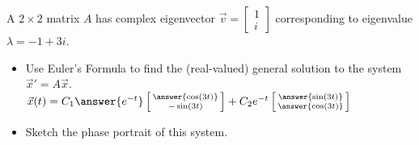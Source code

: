 \documentclass{ximera}
\begin{document}
\begin{exercise}
    A $2\times 2$ matrix $A$ has complex eigenvector $\displaystyle \vec{v}=\begin{bmatrix} 1\\ i \end{bmatrix}$ corresponding to eigenvalue $\lambda=-1+3i$. %
    \begin{itemize}
        \item Use Euler's Formula to find the (real-valued) general solution to the system $\vec{x}'=A\vec{x}$.\\
            $\vec{x}(t) = C_1\answer{e^{-t}}\left[\begin{smallmatrix} \answer{\cos(3t)} \\ -\sin(3t) \end{smallmatrix}\right] + C_2e^{-t}\left[\begin{smallmatrix} \answer{\sin(3t)} \\ \answer{\cos(3t)} \end{smallmatrix}\right]$ 
        \item Sketch the phase portrait of this system.
    \end{itemize}
\end{exercise}
\end{document}
